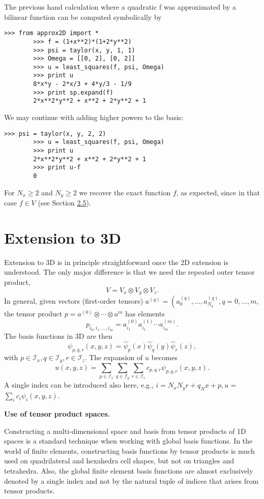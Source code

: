 \documentclass[../main.tex]{subfiles}
\begin{document}
	The previous hand calculation where a quadratic f was approximated by a
	bilinear function can be computed symbolically by
	\begin{lstlisting}[numbers=none]
		>>> from approx2D import *
		>>> f = (1+x**2)*(1+2*y**2)
		>>> psi = taylor(x, y, 1, 1)
		>>> Omega = [[0, 2], [0, 2]]
		>>> u = least_squares(f, psi, Omega)
		>>> print u
		8*x*y - 2*x/3 + 4*y/3 - 1/9
		>>> print sp.expand(f)
		2*x**2*y**2 + x**2 + 2*y**2 + 1	
	\end{lstlisting}
	We may continue with adding higher powers to the basis:
	\begin{lstlisting}[numbers=none]
		>>> psi = taylor(x, y, 2, 2)
		>>> u = least_squares(f, psi, Omega)
		>>> print u
		2*x**2*y**2 + x**2 + 2*y**2 + 1
		>>> print u-f
		0	
	\end{lstlisting}
	For $N_{x} \geq 2$ and $N_{y} \geq 2$ we recover the exact function $f$, as expected, since in that case $f \in V$ (see Section \hyperref[sec:sec_2_5]{2.5}).
	\bigbreak 
	
	\section[Extension to 3D]{Extension to 3D}
	\label{sec:sec_8_4}
	\noindent Extension to 3D is in principle straightforward once the $2 \mathrm{D}$ extension is understood. The only major difference is that we need the repeated outer tensor product,
	$$
	V=V_{x} \otimes V_{y} \otimes V_{z}.
	$$
	In general, given vectors (first-order tensors) $a^{(q)}=\left(a_{0}^{(q)}, \ldots, a_{N_{q}}^{(q)}, q=0, \ldots, m\right.$, the tensor product $p=a^{(0)} \otimes \cdots \otimes a^{m}$ has elements
	$$
	p_{i_{0}, i_{1}, \ldots, i_{m}}=a_{i_{1}}^{(0)} a_{i_{1}}^{(1)} \cdots a_{i_{m}}^{(m)} .
	$$
	The basis functions in $3 \mathrm{D}$ are then
	$$
	\psi_{p, q, r}(x, y, z)=\hat{\psi}_{p}(x) \hat{\psi}_{q}(y) \hat{\psi}_{r}(z),
	$$
	with $p \in \mathcal{I}_{x}, q \in \mathcal{I}_{y}, r \in \mathcal{I}_{z}$. The expansion of $u$ becomes
	$$
	u(x, y, z)=\sum_{p \in \mathcal{I}_{x}} \sum_{q \in \mathcal{I}_{y}} \sum_{r \in \mathcal{I}_{z}} c_{p, q, r} \psi_{p, q, r}(x, y, z) .
	$$
	A single index can be introduced also here, e.g., $i=N_{x} N_{y} r+q_{N} x+p, u=$ $\sum_{i} c_{i} \psi_{i}(x, y, z)$.
	\begin{mybox}
		\textbf{Use of tensor product spaces.}
		
		\noindent Constructing a multi-dimensional space and basis from tensor products of 1D spaces is a standard technique when working with global basis functions. In the world of finite elements, constructing basis functions by tensor products is much used on quadrilateral and hexahedra cell shapes, but not on triangles and tetrahedra. Also, the global finite element basis functions are almost exclusively denoted by a single index and not by the natural tuple of indices that arises from tensor products.
	\end{mybox}
\clearpage
\end{document}
